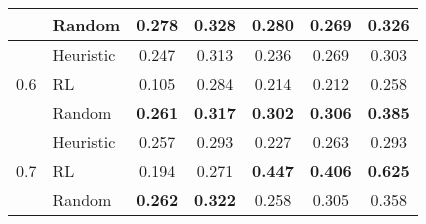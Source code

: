 \begin{table}[!h]
\begin{tabular}{cl|cccc|c}
 & Random & \cellcolor[HTML]{bbd6eb} \color{black} \textbf{0.278} & \cellcolor[HTML]{fee8d2} \color{black} 0.328 & \cellcolor[HTML]{e6f5e1} \color{black} 0.280 & \cellcolor[HTML]{fee6db} \color{black} 0.269 & \cellcolor[HTML]{f6f6f6} \color{black} 0.326 \\
\midrule
\multirow[c]{3}{*}{0.6} & Heuristic & \cellcolor[HTML]{c9ddf0} \color{black} 0.247 & \cellcolor[HTML]{feebd8} \color{black} 0.313 & \cellcolor[HTML]{f1faef} \color{black} 0.236 & \cellcolor[HTML]{fee6db} \color{black} 0.269 & \cellcolor[HTML]{f9f9f9} \color{black} 0.303 \\
 & RL & \cellcolor[HTML]{f7fbff} \color{black} 0.105 & \cellcolor[HTML]{fef2e5} \color{black} 0.284 & \cellcolor[HTML]{f7fcf5} \color{black} 0.214 & \cellcolor[HTML]{fff5f0} \color{black} 0.212 & \cellcolor[HTML]{ffffff} \color{black} 0.258 \\
 & Random & \cellcolor[HTML]{c4daee} \color{black} \textbf{0.261} & \cellcolor[HTML]{feead6} \color{black} \textbf{0.317} & \cellcolor[HTML]{dff2d9} \color{black} \textbf{0.302} & \cellcolor[HTML]{fddbcb} \color{black} \textbf{0.306} & \cellcolor[HTML]{ededed} \color{black} \textbf{0.385} \\
\midrule
\multirow[c]{3}{*}{0.7} & Heuristic & \cellcolor[HTML]{c6dbef} \color{black} 0.257 & \cellcolor[HTML]{fef0e1} \color{black} 0.293 & \cellcolor[HTML]{f4faf1} \color{black} 0.227 & \cellcolor[HTML]{fee8de} \color{black} 0.263 & \cellcolor[HTML]{fafafa} \color{black} 0.293 \\
 & RL & \cellcolor[HTML]{dae8f5} \color{black} 0.194 & \cellcolor[HTML]{fff5eb} \color{black} 0.271 & \cellcolor[HTML]{98d493} \color{black} \textbf{0.447} & \cellcolor[HTML]{fcac90} \color{black} \textbf{0.406} & \cellcolor[HTML]{b5b5b5} \color{black} \textbf{0.625} \\
 & Random & \cellcolor[HTML]{c4daee} \color{black} \textbf{0.262} & \cellcolor[HTML]{fee9d5} \color{black} \textbf{0.322} & \cellcolor[HTML]{ecf7e8} \color{black} 0.258 & \cellcolor[HTML]{fddbcb} \color{black} 0.305 & \cellcolor[HTML]{f2f2f2} \color{black} 0.358 \\
\bottomrule
\end{tabular}
\end{table}